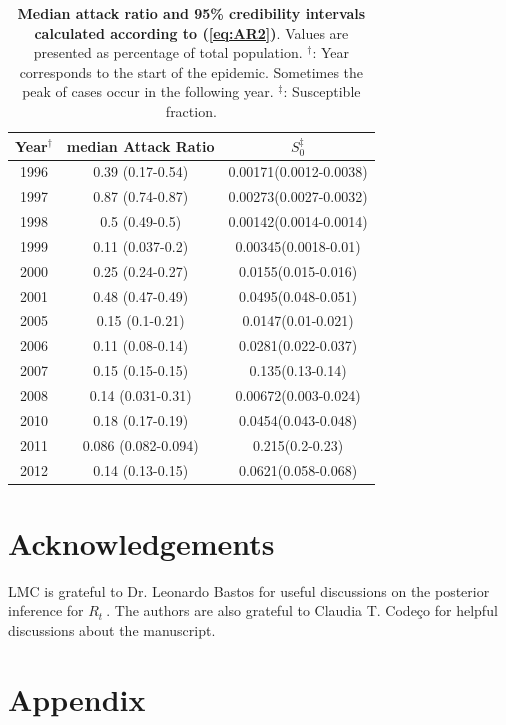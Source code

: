 \documentclass[10pt]{article}
\def \rr {$R_{t}\:$}
\begin{document}
\begin{table}[!ht]
\caption{
{\bf Median attack ratio and 95\% credibility intervals calculated according to 
(\ref{eq:AR2})}. 
Values are presented as percentage of total population. 
$^\dag$: Year corresponds to the start of the epidemic. 
Sometimes the peak of cases occur in the following year.
$^\ddag$: Susceptible fraction.}
\begin{center}
\begin{tabular}{c|c|c}
\hline
Year$^\dag$ & median Attack Ratio & $S_0^\ddag$ \\
\hline
1996 & 0.39 (0.17-0.54) & 0.00171(0.0012-0.0038)\\
1997 & 0.87 (0.74-0.87) & 0.00273(0.0027-0.0032)\\
1998 & 0.5 (0.49-0.5) & 0.00142(0.0014-0.0014)\\
1999 & 0.11 (0.037-0.2) & 0.00345(0.0018-0.01)\\
2000 & 0.25 (0.24-0.27) & 0.0155(0.015-0.016)\\
2001 & 0.48 (0.47-0.49) & 0.0495(0.048-0.051)\\
2005 & 0.15 (0.1-0.21) & 0.0147(0.01-0.021)\\
2006 & 0.11 (0.08-0.14) & 0.0281(0.022-0.037)\\
2007 & 0.15 (0.15-0.15) & 0.135(0.13-0.14)\\
2008 & 0.14 (0.031-0.31) & 0.00672(0.003-0.024)\\
2010 & 0.18 (0.17-0.19) & 0.0454(0.043-0.048)\\
2011 & 0.086 (0.082-0.094) & 0.215(0.2-0.23)\\
2012 & 0.14 (0.13-0.15) & 0.0621(0.058-0.068)\\
\hline
\end{tabular}
\end{center}
\label{tab:AR}
\end{table}

\newpage
\section*{Acknowledgements}
LMC is grateful to Dr. Leonardo Bastos for useful discussions on the 
posterior inference for \rr.
The authors are also grateful to Claudia T. 
Code\c{c}o for helpful discussions about the manuscript.

\newpage


\section*{Appendix}
\end{document}
